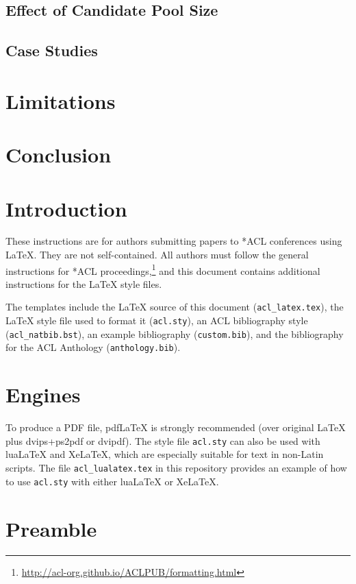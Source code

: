 \documentclass[11pt]{article}
\begin{document}
\subsection{Effect of Candidate Pool Size}
\subsection{Case Studies}

\section{Limitations}
\section{Conclusion}




\section{Introduction}

These instructions are for authors submitting papers to *ACL conferences using \LaTeX. They are not self-contained. All authors must follow the general instructions for *ACL proceedings,\footnote{\url{http://acl-org.github.io/ACLPUB/formatting.html}} and this document contains additional instructions for the \LaTeX{} style files.

The templates include the \LaTeX{} source of this document (\texttt{acl\_latex.tex}),
the \LaTeX{} style file used to format it (\texttt{acl.sty}),
an ACL bibliography style (\texttt{acl\_natbib.bst}),
an example bibliography (\texttt{custom.bib}),
and the bibliography for the ACL Anthology (\texttt{anthology.bib}).

\section{Engines}

To produce a PDF file, pdf\LaTeX{} is strongly recommended (over original \LaTeX{} plus dvips+ps2pdf or dvipdf).
The style file \texttt{acl.sty} can also be used with
lua\LaTeX{} and
Xe\LaTeX{}, which are especially suitable for text in non-Latin scripts.
The file \texttt{acl\_lualatex.tex} in this repository provides
an example of how to use \texttt{acl.sty} with either
lua\LaTeX{} or
Xe\LaTeX{}.

\section{Preamble}
\end{document}
